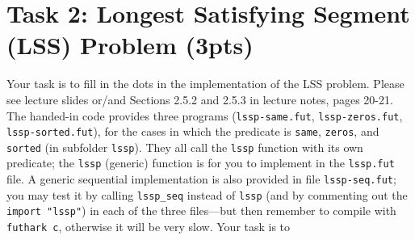\documentclass{article}
\begin{document}
\section{Task 2: Longest Satisfying Segment (LSS) Problem (3pts)}

Your task is to fill in the dots in the implementation of the LSS problem. Please see lecture slides or/and Sections 2.5.2 and 2.5.3 in lecture notes, pages 20-21. The handed-in code provides three programs (\texttt{lssp-same.fut}, \texttt{lssp-zeros.fut}, \texttt{lssp-sorted.fut}), for the cases in which the predicate is \texttt{same}, \texttt{zeros}, and \texttt{sorted} (in subfolder \texttt{lssp}).    They all call the \texttt{lssp} function with its own predicate; the \texttt{lssp} (generic) function is for you to implement in the \texttt{lssp.fut} file.  A generic sequential implementation is also provided in file \texttt{lssp-seq.fut}; you may test it by calling \texttt{lssp\_seq} instead of \texttt{lssp} (and by commenting out the \texttt{import "lssp"}) in each of the three files---but then remember to compile with \texttt{futhark c}, otherwise it will be very slow. Your task is to
\end{document}
